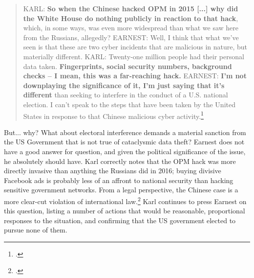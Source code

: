 \documentclass{memoir}
\begin{document}
\begin{refsegment}
\begin{quote}
KARL: \textbf{So when the Chinese hacked OPM in 2015 [...] why did the White House do nothing publicly in reaction to that hack}, which, in some ways, was even more widespread than what we saw here from the Russians, allegedly?
\newline \newline
EARNEST: Well, I think that what we've seen is that these are two cyber incidents that are malicious in nature, but materially different.
\newline \newline
KARL: Twenty-one million people had their personal data taken.  \textbf{Fingerprints, social security numbers, background checks -- I mean, this was a far-reaching hack.}
\newline \newline
EARNEST: \textbf{I'm not downplaying the significance of it, I'm just saying that it's different} than seeking to interfere in the conduct of a U.S. national election. I can't speak to the steps that have been taken by the United States in response to that Chinese malicious cyber activity.\footcite[Transcript adapted from the official White House website.]{earnest_press_2017}
\end{quote}

But... why? What about electoral interference demands a material sanction from the US Government that is not true of cataclysmic data theft? Earnest does not have a good answer for question, and given the political significance of the issue, he absolutely should have. Karl correctly notes that the OPM hack was more directly invasive than anything the Russians did in 2016; buying divisive Facebook ads is probably less of an affront to national security than hacking sensitive government networks. From a legal perspective, the Chinese case is a more clear-cut violation of international law.\footcite[p.~625]{terry_dont_2018} Karl continues to press Earnest on this question, listing a number of actions that would be reasonable, proportional responses to the situation, and confirming that the US government elected to pursue none of them.


\end{refsegment}
\end{document}

